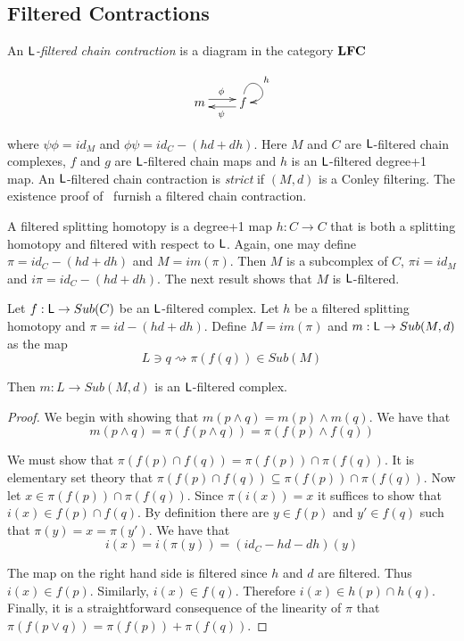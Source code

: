 \subsection{Filtered Contractions}
 
An {\em ${\mathsf L}$-filtered chain contraction} is a diagram in the category ${\bf LFC}$ 

\[
\xymatrixrowsep{0.03in}
\xymatrixcolsep{0.3in}
\xymatrix{
m  \ar[r]<3pt>^{\phi} & \ar[l]<3pt>^{\psi} f \ar@(u,r)^{h}
}
\]

where $\psi\phi = id_M$ and $\phi\psi = id_C-(hd+dh)$.  Here  $M$ and $C$ are ${\mathsf L}$-filtered chain complexes, $f$ and $g$ are ${\mathsf L}$-filtered chain maps and $h$ is an ${\mathsf L}$-filtered degree+1 map.  An ${\mathsf L}$-filtered chain contraction is {\em strict} if $(M,d)$ is a Conley filtering.  The existence proof of~\cite{salamon}  furnish a filtered chain contraction.  

A filtered splitting homotopy is a degree+1 map $h:C\to C$ that is both a splitting homotopy and filtered with respect to ${\mathsf L}$.  Again, one may define $\pi=id_C-(hd+dh)$ and $M=im(\pi)$.  Then $M$ is a subcomplex of $C$, $\pi i = id_M$ and $i\pi = id_C-(hd+dh)$.  The next result shows that $M$ is ${\mathsf L}$-filtered. 

\begin{prop}
Let $f:{\mathsf L}\to Sub(C)$ be an ${\mathsf L}$-filtered complex.  Let $h$ be a filtered splitting homotopy and $\pi = id-(hd+dh)$.  Define $M=im(\pi)$ and $m:{\mathsf L}\to Sub(M,d)$ as the map $$L\ni q\rightsquigarrow  \pi(f(q))\in Sub(M)$$

Then $m:L\to Sub(M,d)$ is an ${\mathsf L}$-filtered complex.
\end{prop}
\begin{proof}
We begin with showing that $m(p \wedge q) = m(p)\wedge m(q)$.  We have that $$m(p\wedge q) = \pi(f(p\wedge q)) = \pi(f(p)\wedge f(q))$$

We must show that $\pi(f(p)\cap f(q)) = \pi(f(p))\cap \pi(f(q))$.  It is elementary set theory that $\pi(f(p)\cap f(q))\subseteq \pi(f(p))\cap \pi(f(q))$.  Now let $x\in \pi(f(p))\cap \pi(f(q))$.  Since $\pi(i(x))=x$ it suffices to show that $i(x)\in f(p)\cap f(q)$.  By definition there are $y\in f(p)$ and $y'\in f(q)$ such that $\pi(y) = x = \pi(y')$.  We have that $$i(x) = i(\pi(y)) = (id_C-hd - dh)(y)$$

The map on the right hand side is filtered since $h$ and $d$ are filtered.  Thus $i(x)\in f(p)$.  Similarly, $i(x)\in f(q)$.  Therefore $i(x)\in h(p)\cap h(q)$.  Finally, it is a straightforward consequence of the linearity of $\pi$ that $\pi(f(p\vee q)) = \pi(f(p))+\pi(f(q))$.


\end{proof}

